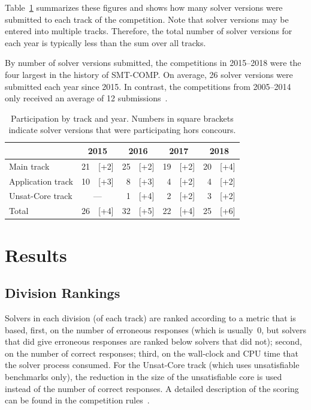 \documentclass[dvipsnames,table,twoside,11pt]{article}
\begin{document}
Table~\ref{table:participation-by-track} summarizes these figures and
shows how many solver versions were submitted to each track of the
competition.  Note that solver versions may be entered into multiple
tracks.  Therefore, the total number of solver versions for each year
is typically less than the sum over all tracks.

By number of solver versions submitted, the competitions in 2015--2018
were the four largest in the history of SMT-COMP.  On average, 26
solver versions were submitted each year since 2015.  In contrast, the
competitions from 2005--2014 only received an average of 12
submissions~\cite{CDW14}.

\begin{table}
  \caption{Participation by track and year.  Numbers in square
    brackets indicate solver versions that were participating hors
    concours.}
  \label{table:participation-by-track}
  \centering
  \begin{tabular}{lr@{\,\,}rr@{\,\,}rr@{\,\,}rr@{\,\,}r}
    \toprule
                      & \multicolumn{2}{c}{2015} & \multicolumn{2}{c}{2016} & \multicolumn{2}{c}{2017} & \multicolumn{2}{c}{2018} \\
    \midrule
    Main track        & 21 &               [+2] & 25 & [+2] & 19 & [+2] & 20 & [+4] \\
    Application track & 10 &               [+3] &  8 & [+3] &  4 & [+2] &  4 & [+2] \\
    Unsat-Core track  & \multicolumn{2}{c}{---} &  1 & [+4] &  2 & [+2] &  3 & [+2] \\
    \midrule
    Total             & 26 &               [+4] & 32 & [+5] & 22 & [+4] & 25 & [+6] \\
    \bottomrule
  \end{tabular}
\end{table}


\section{Results}
\label{sec:results}

\subsection{Division Rankings}
\label{sec:division-rankings}

Solvers in each division (of each track) are ranked according to a
metric that is based, first, on the number of erroneous responses
(which is usually~0, but solvers that did give erroneous responses are
ranked below solvers that did not); second, on the number of correct
responses; third, on the wall-clock and CPU time that the solver
process consumed.  For the Unsat-Core track (which uses unsatisfiable
benchmarks only), the reduction in the size of the unsatisfiable core
is used instead of the number of correct responses.  A detailed
description of the scoring can be found in the competition
rules~\cite{rules18}.
\end{document}
